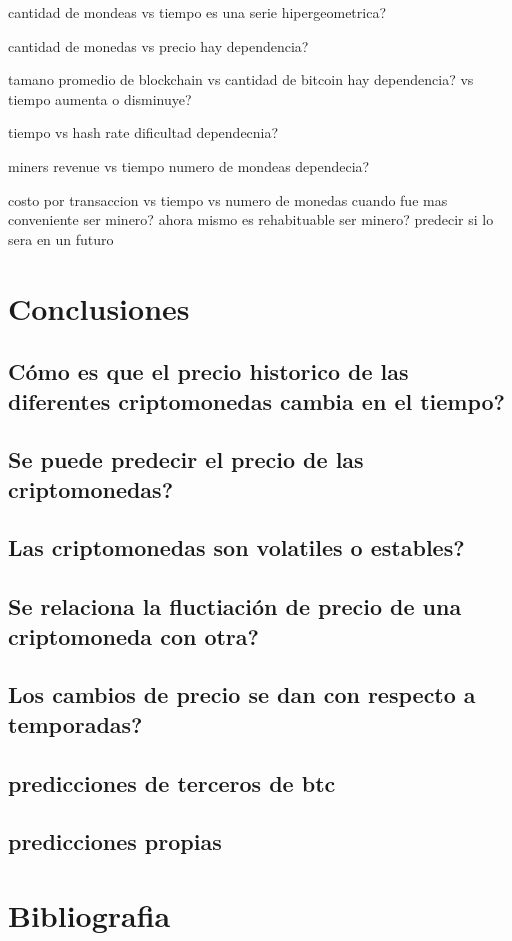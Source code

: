 \documentclass[12pt,letterpaper]{article}
\begin{document}
    cantidad de mondeas vs tiempo
        es una serie hipergeometrica?

    cantidad de monedas vs precio
        hay dependencia?

    tamano promedio de blockchain
        vs cantidad de bitcoin
            hay dependencia?
        vs tiempo
            aumenta o disminuye?

    tiempo vs hash rate
        dificultad
            dependecnia?

    miners revenue vs tiempo
        numero de mondeas
         dependecia?

    costo por transaccion vs tiempo
        vs numero de monedas
            cuando fue mas conveniente ser minero?
            ahora mismo es rehabituable ser minero?
                predecir si lo sera en un futuro

\section*{Conclusiones}

	\subsection*{C\'omo es que el precio historico de las diferentes criptomonedas cambia en el tiempo?}
	\subsection*{Se puede predecir el precio de las criptomonedas?}
	\subsection*{Las criptomonedas son volatiles o estables?}
	\subsection*{Se relaciona la fluctiaci\'on de precio de una criptomoneda con otra?}
	\subsection*{Los cambios de precio se dan con respecto a temporadas?}
	\subsection*{predicciones de terceros de btc}
	\subsection*{predicciones propias}
	
\section{Bibliografia}
\end{document}
